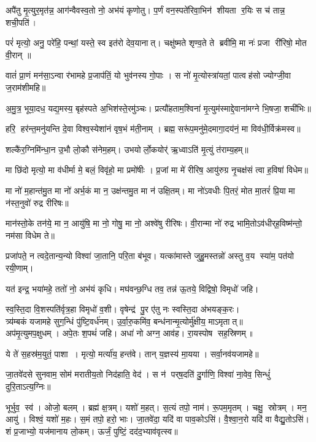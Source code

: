 
अपै॑तु मृ॒त्युर॒मृत॑न्न॒ आग॑न्वैवस्व॒तो नो॒ अभ॑यं कृणोतु।
प॒र्णं वन॒स्पते॑रिवा॒भिन॑ शीयता र॒यिः स च॑ तान्न॒ शची॒पति॑।

परं॑ मृत्यो॒ अनु॒ परे॑हि॒ पन्थां॒ यस्ते॒ स्व इत॑रो देव॒यानात्।
चक्षु॑ष्मते शृण्व॒ते ते ब्रवीमि॒ मा नः॑ प्रजा री॑रिषो॒ मोत वी॒रान् ॥

वातं॑ प्रा॒णं मन॑सा॒ऽन्वा र॑भामहे प्र॒जाप॑तिं॒ यो भुव॑नस्य गो॒पाः ।
स नो॑ मृ॒त्योस्त्रा॑यतां॒ पात्वह॑सो ज्योग्जी॒वा ज॒राम॑शीमहि॥

अ॒मु॒त्र॒ भूया॒दध॒ यद्य॒मस्य॒ बृह॑स्पते अ॒भिश॑स्ते॒रमु॑ञ्चः।
प्रत्यौ॑हताम॒श्विना॑ मृ॒त्युम॑स्माद्दे॒वाना॑मग्ने भि॒षजा॒ शची॑भिः॥

हरि॒ हर॑न्त॒मनु॑यन्ति दे॒वा विश्व॒स्येशा॑नं वृष॒भं म॑ती॒नाम् । ब्रह्म॒ सरू॑प॒मनु॑मे॒दमागा॒दय॑नं॒ मा विव॑धी॒र्विक्र॑मस्व॥

शल्कै॑र॒ग्निमि॑न्धा॒न उ॒भौ लो॒कौ स॑नेम॒हम्। उभयोर्लो॒कयोर्॑ ऋ॒ध्वाऽति॑ मृ॒त्युं त॑राम्य॒हम्॥

मा छि॑दो मृत्यो॒ मा व॑धीर्मा मे॒ बलं॒ विवृ॑हो॒ मा प्रमो॑षीः । प्र॒जां मा मे॑ रीरिष॒ आयु॑रुग्र नृ॒चक्ष॑सं त्वा ह॒विषा॑ विधेम॥

मा नो॑ म॒हान्त॑मु॒त मा नो॑ अर्भ॒कं मा न॒ उक्ष॑न्तमु॒त मा न॑ उक्षि॒तम्।
 मा नो॑ऽवधीः पि॒तरं॒ मोत मा॒तरं॑ प्रि॒या मा न॑स्त॒नुवो॑ रुद्र रीरिषः॥
 
मान॑स्तो॒के तन॑ये॒ मा न॒ आयु॑षि॒ मा नो॒ गोषु॒ मा नो॒ अश्वे॑षु रीरिषः।
 वी॒रान्मा नो॑ रुद्र भामि॒तोऽव॑धीर्‌ह॒विष्म॑न्तो॒ नम॑सा विधेम ते॥ 

प्रजा॑पते॒ न त्वदे॒तान्य॒न्यो विश्वा॑ जा॒तानि॒ परि॒ता ब॑भूव। यत्का॑मास्ते जुहु॒मस्तन्नो॑ अस्तु व॒य स्या॑म॒ पत॑यो रयी॒णाम्। 

यत॑ इन्द्र॒ भया॑महे॒ ततो॑ नो॒ अभ॑यं कृधि।
मघ॑वन्छ॒ग्धि तव॒ तन्न॑ ऊ॒तये॒ विद्विषो॒ विमृधो॑ जहि।

स्व॒स्ति॒दा वि॒शस्पति॑र्वृत्र॒हा विमृधो॑ व॒शी।
वृषेन्द्र॑ पु॒र ए॑तु नः स्वस्ति॒दा अ॑भयङ्क॒रः।\\

त्र्य॑म्बकं यजामहे सुग॒न्धिं पु॑ष्टि॒वर्ध॑नम्।
 उ॒र्वा॒रु॒कमि॑व॒ बन्ध॑नान्मृ॒त्योर्मु॑क्षीय॒ माऽमृतात्॥\\

   अप॑मृ॒त्युमप॒क्षुधम्।   अपे॒तः श॒पथं॑ जहि।
   अधा॑ नो अग्न॒ आव॑ह।   रा॒यस्पोष सह॒स्रिणम्॥

   ये ते॑ स॒हस्र॑म॒युतं॒ पाशा।   मृत्यो॒ मर्त्या॑य॒ हन्त॑वे।
   तान् य॒ज्ञस्य॑ मा॒यया।   सर्वा॒नव॑यजामहे॥

जा॒तवे॑दसे सुनवाम॒ सोम॑ मरातीय॒तो निद॑हाति॒ वेद॑।
स न॑ पर्‌ष॒दति॑ दु॒र्गाणि॒ विश्वा॑ ना॒वेव॒ सिन्धुं॑ दुरि॒ताऽत्य॒ग्निः॥

   भूर्भुव॒ स्व॑।
   ओजो॒ बलम्।
   ब्रह्म॑ क्ष॒त्रम्।
   यशो॑ म॒हत्।
   स॒त्यं तपो॒ नाम॑।
   रू॒पम॒मृतम्।
   चक्षु॒ स्रोत्रम्।
   मन॒ आयु॑।
   विश्वं॒ यशो॑ म॒हः।
   स॒मं तपो॒ हरो॒ भाः।
   जा॒तवे॑दा॒ यदि॑ वा पाव॒कोऽसि॑।
   वै॒श्वा॒न॒रो यदि॑ वा वैद्यु॒तोऽसि॑।
   शं प्र॒जाभ्यो॒ यज॑मानाय लो॒कम्।
   ऊर्जं॒ पुष्टिं॒ दद॑द॒भ्याव॑वृत्स्व॥